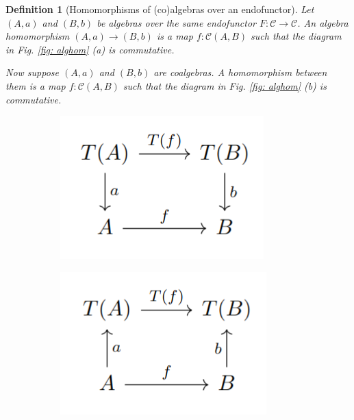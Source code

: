 \documentclass[11pt,a4paper,openright,twoside]{report}
\newcounter{mycounter}
\theoremstyle{plain}
\newtheorem{definition}[mycounter]{Definition}
\theoremstyle{definition}
\begin{document}
\begin{definition}[Homomorphisms of (co)algebras over an endofunctor]
  Let $(A,a)$ and $(B,b)$ be algebras over the same endofunctor $F: \mathcal{C} \to \mathcal{C}$. An algebra homomorphism $(A,a)\to (B,b)$ is a map $f: \mathcal{C}(A,B)$ such that the diagram in \textit{Fig. \ref{fig: alghom} (a)} is commutative.


  Now suppose $(A,a)$ and $(B,b)$ are coalgebras. A homomorphism between them is a map $f: \mathcal{C}(A,B)$ such that the diagram in \textit{Fig. \ref{fig: alghom} (b)} is commutative.
\end{definition}

\begin{figure}[h]
  \begin{center}
    \begin{subfigure}{0.25\textwidth}
      \includegraphics[width=\textwidth]{figures/algebra_hom.png}
      \caption{}
    \end{subfigure}
    \begin{subfigure}{0.25\textwidth}
      \includegraphics[width=\textwidth]{figures/coalgebra_hom.png}

\end{subfigure}
\end{center}
\end{figure}
\end{document}
